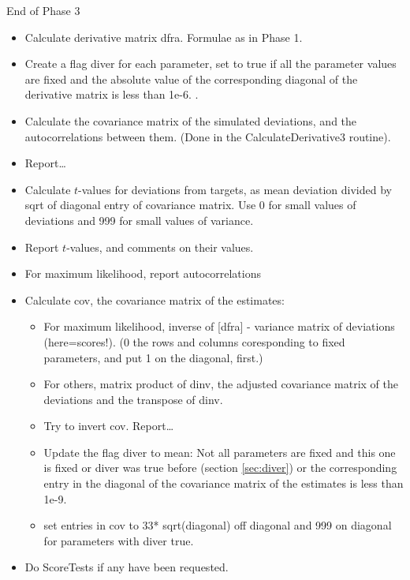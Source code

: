 \documentclass[12pt,a4paper]{article}
\makeatletter
\renewcommand{\=}{\,=\,}
\newcommand{\+}{\,+\,}
\newcommand{\nm}[1]{\textsf{\small #1}}
\renewcommand{\subsubsection}{\@startsection{subsubsection}{3}
                {0pt}{0.5\baselineskip}{0.3\baselineskip}
                {\it\sffamily} }
\makeatother
\begin{document}
\subsubsection{End of Phase 3}
\begin{itemize}
\item
Calculate derivative matrix \nm{dfra}. Formulae as in Phase 1.
\item
Create a flag \nm{diver} for each parameter, set to true if all the
parameter values are fixed and the absolute value of the corresponding
diagonal of the derivative matrix is less than 1e-6. \label{sec:diver}.
\item
Calculate the covariance matrix of the simulated deviations, and
the autocorrelations between them. (Done in the CalculateDerivative3
routine).
\item
Report\ldots
\item Calculate $t$-values for deviations from targets, as mean
  deviation divided by sqrt of diagonal entry of covariance
  matrix. Use 0 for small values of deviations and 999 for small
  values of variance.
\item
Report $t$-values, and comments on their values.
\item For maximum likelihood, report autocorrelations
\item Calculate \nm{cov}, the covariance matrix of the estimates:
\begin{itemize}
\item For maximum likelihood, inverse of \nm[dfra] - variance matrix of
  deviations (here=scores!). (0 the rows and columns coresponding to
  fixed parameters, and put 1 on the diagonal, first.)
\item For others, matrix product of \nm{dinv}, the adjusted covariance
  matrix of the deviations and the transpose of \nm{dinv}.
\item Try to invert \nm{cov}. Report\ldots
\item Update the flag \nm{diver} to mean: Not all parameters are fixed
  and this one is fixed or \nm{diver} was true before (section
  \ref{sec:diver}) or the corresponding entry in the diagonal of the
  covariance matrix of the estimates is less than 1e-9. \label{sec:diver2}
\item
  set entries in \nm{cov} to 33* sqrt(diagonal) off diagonal and 999
  on diagonal for parameters with \nm{diver} true.
\end{itemize}
\item Do ScoreTests if any have been requested.
\end{itemize}
\end{document}

